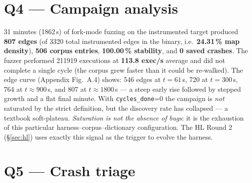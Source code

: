 \documentclass[letterpaper,twocolumn,10pt]{article}
\begin{document}
\section{Q4 — Campaign analysis}
\label{sec:q4}
31 minutes (1862\,s) of fork-mode fuzzing on the instrumented target produced
\textbf{807 edges} (of 3320 total instrumented edges in the binary, i.e.\
\textbf{24.31\,\% map density}), \textbf{506 corpus entries},
\textbf{100.00\,\% stability}, and \textbf{0 saved crashes}. The fuzzer
performed 211919 executions at \textbf{113.8 exec/s} average and did not
complete a single cycle (the corpus grew faster than it could be re-walked).
The edge curve (Appendix Fig.\ A.4) shows: 546 edges at $t{=}61$\,s, 720 at
$t{=}300$\,s, 764 at $t{\approx}900$\,s, and 807 at $t{\approx}1800$\,s ---
a steep early rise followed by stepped growth and a flat final minute. With
\texttt{cycles\_done}=0 the campaign is \emph{not} saturated by the strict
definition, but the discovery rate has collapsed --- a textbook soft-plateau.
\emph{Saturation is not the absence of bugs}: it is the
exhaustion of this particular harness--corpus--dictionary configuration. The
HL Round 2 (§\ref{sec:hl}) uses exactly this signal as the trigger to evolve
the harness.

\section{Q5 — Crash triage}
\label{sec:q5}

\end{document}
